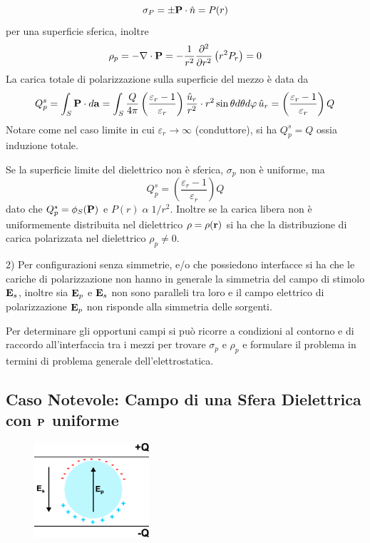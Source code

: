 \begin{equation*}
	\sigma_P = \pm \bold{P} \cdot \hat{n} = P(r) 
\end{equation*}
per una superficie sferica, inoltre 
\begin{equation*}
	\rho_{p} = - \nabla \cdot \bold{P} = - \frac{1}{r^2} \frac{\partial^2 }{\partial r^2}\left(r^2 P_{r}\right) = 0
\end{equation*} 
La carica totale di polarizzazione sulla superficie del mezzo \`e data da 
\begin{equation*}
	Q_{p}^{s} = \int_{S} \bold{P} \cdot d \bold{a} = \int_{S} \frac{Q}{4 \pi }\left(\frac{\varepsilon_r -1}{\varepsilon_r}\right) \frac{\hat{u}_{r}}{r^2} \cdot r^2\sin\theta d\theta d\varphi \,\hat{u}_{r} = \left(\frac{\varepsilon_r -1 }{\varepsilon_r} \right)Q
\end{equation*}
Notare come nel caso limite in cui $\varepsilon_{r} \to \infty$ (conduttore), si ha $Q_{p}^{s} = Q$ ossia induzione totale.
\newline

Se la superficie limite del dielettrico non \`e sferica, $\sigma_p$ non \`e uniforme, ma 
\begin{equation*}
	Q_{p}^{s} = \left(\frac{\varepsilon_r -1 }{\varepsilon_r} \right)Q
\end{equation*}
dato che $Q_{p}^{s} = \phi_{S}(\bold{P})$ e $P(r) \; \alpha \; 1/r^2$. Inoltre se la carica libera non \`e uniformemente distribuita nel dielettrico $\rho = \rho (\bold{r})$ si ha che la distribuzione di carica polarizzata nel dielettrico $\rho_p \neq 0$.
\newline

2) Per configurazioni senza simmetrie, e/o che possiedono interfacce si ha che le cariche di polarizzazione non hanno in generale la simmetria del campo di stimolo $\bold{E}_{s}$, inoltre sia $\bold{E}_{p}$ e $\bold{E}_{s}$ non sono paralleli tra loro e il campo elettrico di polarizzazione $\bold{E}_{p}$ non risponde alla simmetria delle sorgenti.

Per determinare gli opportuni campi si pu\`o ricorre a condizioni al contorno e di raccordo all'interfaccia tra i mezzi per trovare $\sigma_{p}$ e $\rho_{p}$ e formulare il problema in termini di problema generale dell'elettrostatica.

\subsection{Caso Notevole: Campo di una Sfera Dielettrica con $\bold{P}$ uniforme}
\begin{figure} %
    \centering
    \includegraphics[width=0.38\textwidth]{images/spherepol} %
\end{figure}

